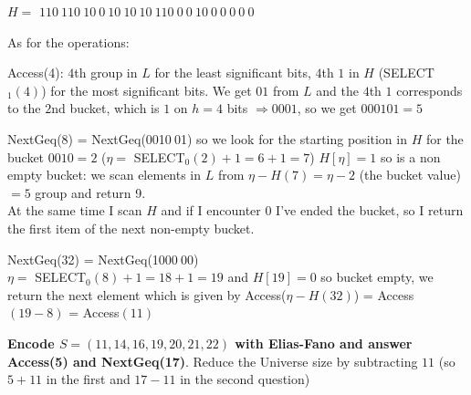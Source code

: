 \documentclass[10pt]{report}
\begin{document}
\begin{list}{}{}
\begin{list}{}{}
		\item[$H =$] $110\:110\:10\:0\:10\:10\:10\:110\:0\:0\:10\:0\:0\:0\:0\:0$
	\end{list}
	As for the operations:
	\begin{list}{}{}
		\item Access(4): $4$th group in $L$ for the least significant bits, $4$th $1$ in $H$ (SELECT$_1(4)$) for the most significant bits. We get $01$ from $L$ and the $4$th $1$ corresponds to the $2$nd bucket, which is $1$ on $h = 4$ bits $\Rightarrow 0001$, so we get $000101 = 5$
		\item NextGeq(8) = NextGeq(0010$\:$01) so we look for the starting position in $H$ for the bucket $0010 = 2$ ($\eta =$ SELECT$_0(2)+1 = 6+1 = 7$) $H[\eta] = 1$ so is a non empty bucket: we scan elements in $L$ from $\eta - H(7) = \eta - 2$ (the bucket value) $ = 5$ group and return 9.\\
		At the same time I scan $H$ and if I encounter 0 I've ended the bucket, so I return the first item of the next non-empty bucket.
		\item NextGeq(32) = NextGeq(1000$\:$00)\\
		$\eta =$ SELECT$_0(8) + 1 = 18+1 = 19$ and $H[19] = 0$ so bucket empty, we return the next element which is given by Access($\eta-H(32)$) = Access$(19-8)$ = Access$(11)$
	\end{list}
	\item \textbf{Encode $S=(11,14,16,19,20,21,22)$ with Elias-Fano and answer Access(5) and NextGeq(17)}. Reduce the Universe size by subtracting $11$ (so $5+11$ in the first and $17-11$ in the second question)
\end{list}
\end{document}
